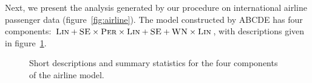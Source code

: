 \documentclass[letterpaper]{article}
\newcommand{\procedurename}{ABCDE}
\begin{document}
Next, we present the analysis generated by our procedure on international airline passenger data (figure~\ref{fig:airline}).
The model constructed by \procedurename{} has four components: ${\textsc{Lin}} + {\textsc{SE}} \times {\textsc{Per}} \times {\textsc{Lin}} + {\textsc{SE}} + {\textsc{WN}} \times {\textsc{Lin}}$, with descriptions given in figure~\ref{fig:exec-airline}.
%
\begin{figure}[h]
\centering
{}
\caption{
Short descriptions and summary statistics for the four components of the airline model.}
\label{fig:exec-airline}
\end{figure}
\end{document}
